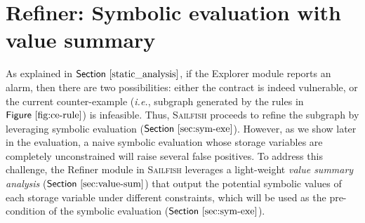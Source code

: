 \documentclass[conference, romanappendices]{tex/IEEEtran}
\theoremstyle{bfnote}
\newcommand{\toolname}{\textsc{Sailfish}\xspace}
\newcommand{\explorer}{{\sc Explorer}\xspace}
\newcommand{\refiner}{{\sc Refiner}\xspace}
\newcommand{\ie}{\textit{i.e.}}
\newcommand{\Fig}[1]{\ensuremath{\sf Figure~\ref{#1}}}
\newcommand{\Sect}[1]{\ensuremath{\sf Section~\ref{#1}}}
\begin{document}
 	\section{\refiner: Symbolic evaluation with value summary}
\label{refinement}
As explained in \Sect{static_analysis}, if the \explorer module reports an alarm, then there are two possibilities: either the contract is indeed vulnerable, or the current counter-example (\ie, subgraph generated by the rules in \Fig{fig:ce-rule}) is infeasible.
Thus, \toolname proceeds to refine the subgraph by leveraging symbolic evaluation (\Sect{sec:sym-exe}).
However, as we show later in the evaluation, a naive symbolic evaluation whose storage variables are completely unconstrained will raise several false positives.
To address this challenge, the \refiner module in \toolname leverages a light-weight \emph{value summary analysis} (\Sect{sec:value-sum}) that output the potential symbolic values of each storage variable under different constraints, which will be used as the pre-condition of the symbolic evaluation (\Sect{sec:sym-exe}).
\end{document}
